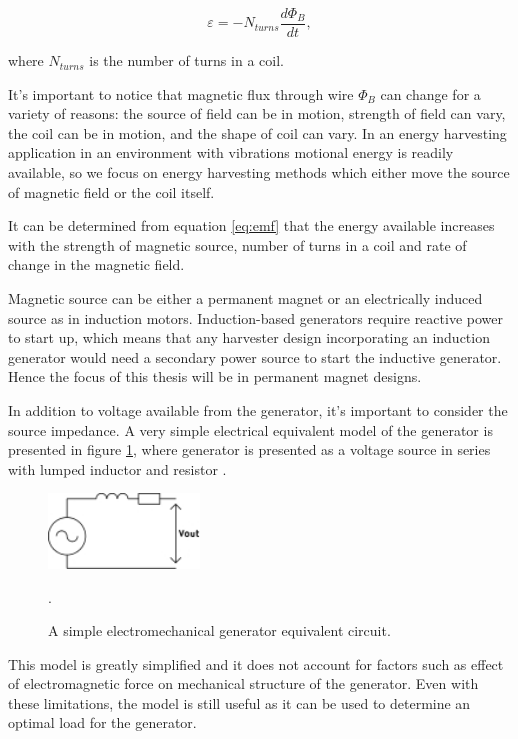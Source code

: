 \begin{equation} \label{eq:emf}
  \varepsilon = -N_{turns} \frac{d \Phi_{B}}{d t} , 
\end{equation}

where $N_{turns}$ is the number of turns in a coil. \cite[p.999]{universityphysics}

It's important to notice that magnetic flux through wire $ \Phi_{B} $ can change for a variety of reasons: the source of field can be in motion, strength of field can vary, the coil can be in motion, and the shape of coil can vary. In an energy harvesting application in an environment with vibrations motional energy is readily available, so we focus on energy harvesting methods which either move the source of magnetic field or the coil itself.

It can be determined from equation \eqref{eq:emf} that the energy available increases with the strength of magnetic source, number of turns in a coil and rate of change in the magnetic field. 

Magnetic source can be either a permanent magnet or an electrically induced source as in induction motors. Induction-based generators require reactive power to start up, which means that any harvester design incorporating an induction generator would need a secondary power source to start the inductive generator. Hence the focus of this thesis will be in permanent magnet designs.

In addition to voltage available from the generator, it's important to consider the source impedance. A very simple electrical equivalent model of the generator is presented in figure \ref{gen_simple}, where generator is presented as a voltage source in series with lumped inductor and resistor \cite{Jirutitijaroen2012}. 

\begin{figure}[htb]
\begin{center}
\includegraphics[height=2cm]{images/own_dwg/gen_simple}
\end{center}
\caption{A simple electromechanical generator equivalent circuit.}.
\label{gen_simple}
\end{figure}

This model is greatly simplified and it does not account for factors such as effect of electromagnetic force on mechanical structure of the generator. Even with these limitations, the model is still useful as it can be used to determine an optimal load for the generator. 

